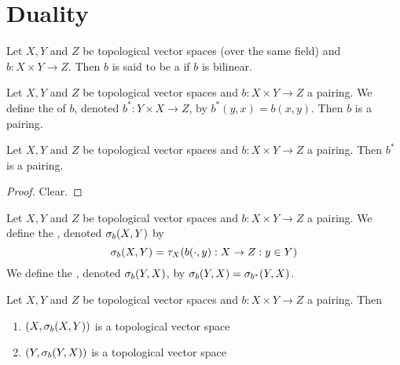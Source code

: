 \documentclass{book}
\begin{document}
	
	
	
	
	
	
	
	
	
	
	
	
	
	
	
	
	
	
	
	
	
	
	
	
	
	\newpage
	\section{Duality}
	
	\begin{defn}
		Let $X,Y$ and $Z$ be topological vector spaces (over the same field) and $b : X \times Y \rightarrow Z$. Then $b$ is said to be a  if $b$ is bilinear. 
	\end{defn}

	\begin{defn}
		Let $X,Y$ and $Z$ be topological vector spaces and $b : X \times Y \rightarrow Z$ a pairing. We define the  of $b$, denoted $b^*:Y \times X \rightarrow Z$, by $b^*(y,x) = b(x,y)$. Then $b$ is a pairing. 
	\end{defn}

	\begin{ex}
		Let $X,Y$ and $Z$ be topological vector spaces and $b : X \times Y \rightarrow Z$ a pairing. Then $b^*$ is a pairing.
	\end{ex}

	\begin{proof}
		Clear.
	\end{proof}

	\begin{defn}
		Let $X,Y$ and $Z$ be topological vector spaces and $b : X \times Y \rightarrow Z$ a pairing. We define the , denoted $\sigma_b(X, Y)$ by 
		$$\sigma_b(X,Y) = \tau_{X}(b(\cdot, y): X \rightarrow Z: y \in Y)$$ 
		We define the , denoted $\sigma_b(Y, X)$, by $\sigma_b(Y,X) = \sigma_{b^*}(Y, X)$.
	\end{defn}

	\begin{ex}
		Let $X,Y$ and $Z$ be topological vector spaces and $b : X \times Y \rightarrow Z$ a pairing. Then 
		\begin{enumerate}
			\item $(X, \sigma_b(X, Y))$ is a topological vector space
			\item $(Y, \sigma_b(Y, X))$ is a topological vector space
		\end{enumerate}
	\end{ex}
\end{document}
